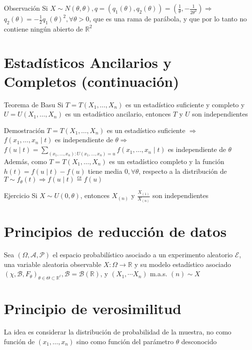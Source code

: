 Observación Si $X \sim N(\theta, \theta), q=\left(q_{1}(\theta), q_{2}(\theta)\right)=\left(\frac{1}{\theta},-\frac{1}{2 \theta^{2}}\right) \Rightarrow$ $q_{2}(\theta)=-\frac{1}{2} q_{1}(\theta)^{2}, \forall \theta>0$, que es una rama de parábola, y que por lo tanto no contiene ningún abierto de $\mathbb{R}^{2}$

\section*{Estadísticos Ancilarios y Completos (continuación)}
Teorema de Basu Si $T=T\left(X_{1}, \ldots, X_{n}\right)$ es un estadístico suficiente y completo y $U=U\left(X_{1}, \ldots, X_{n}\right)$ es un estadístico ancilario, entonces $T$ y $U$ son independientes

Demostración $T=T\left(X_{1}, \ldots, X_{n}\right)$ es un estadístico suficiente $\Rightarrow$ $f\left(x_{1}, \ldots, x_{n} \mid t\right)$ es independiente de $\theta \Rightarrow$ $f(u \mid t)=\sum_{\left(x_{1}, \ldots, x_{n}\right): U\left(x_{1}, \ldots, x_{n}\right)=u} f\left(x_{1}, \ldots, x_{n} \mid t\right)$ es independiente de $\theta$ Además, como $T=T\left(X_{1}, \ldots, X_{n}\right)$ es un estadístico completo y la función $h(t)=f(u \mid t)-f(u)$ tiene media $0, \forall \theta$, respecto a la distribución de $T \sim f_{\theta}(t) \Rightarrow f(u \mid t) \stackrel{c s}{=} f(u)$

Ejercicio Si $X \sim U(0, \theta)$, entonces $X_{(n)}$ y $\frac{X_{(1)}}{X_{(n)}}$ son independientes

\section*{Principios de reducción de datos}
Sea $(\Omega, \mathcal{A}, \mathcal{P})$ el espacio probabilístico asociado a un experimento aleatorio $\mathcal{E}$, una variable aleatoria observable $X: \Omega \longrightarrow \mathbb{R}$ y su modelo estadístico asociado $\left(\chi, \mathcal{B}, F_{\theta}\right)_{\theta \in \Theta \subset \mathbb{R}^{\ell}}, \mathcal{B}=\mathcal{B}(\mathbb{R})$, y $\left(X_{1}, \cdots X_{n}\right)$ m.a.s. $(n) \sim X$

\section*{Principio de verosimilitud}
La idea es considerar la distribución de probabilidad de la muestra, no como función de $\left(x_{1}, \ldots, x_{n}\right)$ sino como función del parámetro $\theta$ desconocido

